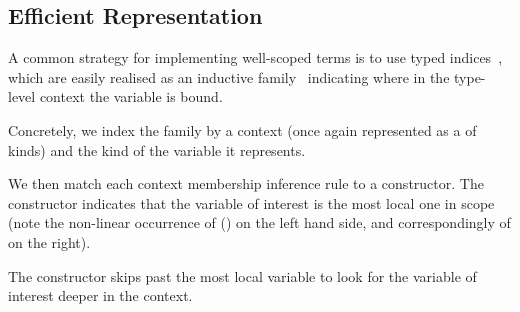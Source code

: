 \subsection{Efficient \DeBruijn{} Representation}
\label{sec:design:deBruijn}

A common strategy for implementing well-scoped terms is to use typed
\emph{\DeBruijn{}} indices~\cite{MANUAL:journals/math/debruijn72},
which are easily realised as an inductive family~\cite{DBLP:journals/fac/Dybjer94}
indicating where in the type-level context the variable is bound.

Concretely, we index the  family by a context
(once again represented as a  of kinds) and
the kind of the variable it represents.

\begin{centertight}
\begin{minipage}{0.10\textwidth}
\varRule
\end{minipage}\hfill
\begin{minipage}{0.80\textwidth}
\end{minipage}
\end{centertight}

We then match each context membership inference rule to a constructor.
%
The  constructor indicates that the variable of interest is
the most local one in scope (note the non-linear occurrence of () on
the left hand side, and correspondingly of  on the right).

\begin{centertight}
\begin{minipage}{0.35\textwidth}
  \varZero
\end{minipage}\hfill
\begin{minipage}{0.55\textwidth}
\end{minipage}
\end{centertight}

The  constructor skips past the most local variable to look for the variable of interest deeper in the context.

\begin{centertight}
\begin{minipage}{0.35\textwidth}
  \varSuc
\end{minipage}\hfill
\begin{minipage}{0.55\textwidth}
\end{minipage}
\end{centertight}


